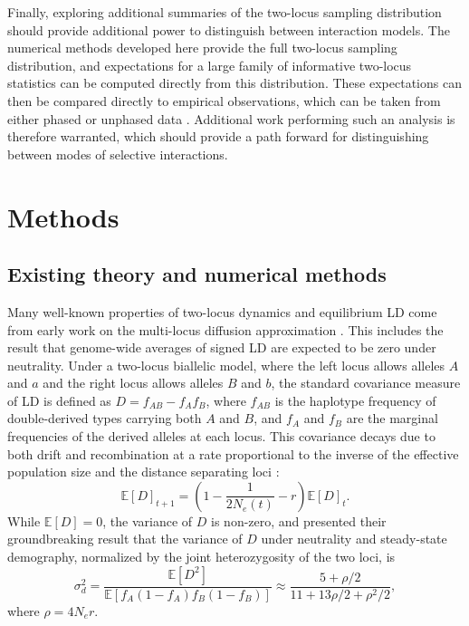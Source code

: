 \documentclass[]{article}
\newcommand{\E}{\mathbb{E}}
\begin{document}
Finally, exploring additional summaries of the two-locus sampling distribution
should provide additional power to distinguish between interaction models. The
numerical methods developed here provide the full two-locus sampling
distribution, and expectations for a large family of informative two-locus
statistics can be computed directly from this distribution. These expectations
can then be compared directly to empirical observations, which can be taken
from either phased or unphased data \citep{Ragsdale2020-nz}. Additional work
performing such an analysis is therefore warranted, which should provide a path
forward for distinguishing between modes of selective interactions.

\section{Methods}\label{sec:methods}

\subsection{Existing theory and numerical methods}

Many well-known properties of two-locus dynamics and equilibrium LD come from
early work on the multi-locus diffusion approximation \citep{Kimura1955-qe,
Hill1968-vu, Ohta1969-ie, Ohta1971-yd}. This includes the result that
genome-wide averages of signed LD are expected to be zero under neutrality.
Under a two-locus biallelic model, where the left locus allows alleles \(A\)
and \(a\) and the right locus allows alleles \(B\) and \(b\), the standard
covariance measure of LD is defined as \(D = f_{AB} - f_{A}f_{B}\), where
\(f_{AB}\) is the haplotype frequency of double-derived types carrying both
\(A\) and \(B\), and \(f_{A}\) and \(f_{B}\) are the marginal frequencies of
the derived alleles at each locus. This covariance decays due to both drift and
recombination at a rate proportional to the inverse of the effective population
size and the distance separating loci \citep{Hill1968-vu}:
\[\E[D]_{t+1} = \left(1 - \frac{1}{2N_e(t)} - r \right)\E[D]_t.\]
While \(\E[D] = 0\), the variance of \(D\) is non-zero, and \citet{Ohta1971-yd}
presented their groundbreaking result that the variance of \(D\) under
neutrality and steady-state demography, normalized by the joint heterozygosity
of the two loci, is
\begin{equation}
    \label{eq:ohta}
    \sigma_d^2 = \frac{\E[D^2]}{\E[f_A(1-f_A)f_B(1-f_B)]}
    \approx\frac{5 + \rho / 2}{11 + 13\rho/ 2 + \rho^2 / 2},
\end{equation}
where \(\rho = 4N_e r\).
\end{document}
